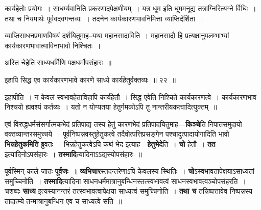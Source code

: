 \documentclass[article,12pt,a4paper]{memoir}
\begin{document}
	  \endgroup
	 

	  \pstart कार्यहेतोः प्रयोगः । साधर्म्यवानिति प्रकरणादपेक्षणीयम् । यत्र धूम इति धूममनूद्य तत्राग्निरित्यग्ने र्विधिः । तथा च नियमार्थः पूर्ववदवगन्तव्यः । तदनेन कार्यकारणभावनिमित्ता व्याप्तिर्दर्शिता ।
	\pend
        

	  \pstart व्याप्तिसाधनप्रमाणविषयं दर्शयितुमाह--यथा महानसादाविति । महानसादौ हि प्रत्यक्षानुपलम्भाभ्यां कार्यकारणभावात्माविनाभावो निश्चितः ।
	\pend
        

	  \pstart अस्ति चेहेति साध्यधर्मिणि पक्षधर्मोपसंहारः ॥
	\pend
        
	  \bigskip
	  \begingroup
	

	  \pstart इहापि सिद्ध एव कार्यकारणभावे कारणे साध्ये कार्यहेतुर्वक्तव्यः ॥ २२ ॥
	\pend
      
	  \endgroup
	 

	  \pstart इहापीति । न केवलं स्वभावहेताविहापि कार्यहेतौ । सिद्ध एवेति निश्चिते कार्यकारणत्वे । कार्यकारणभाव निश्चयो ह्यवश्यं कर्तव्यः । यतो न योग्यतया हेतुर्गमकोऽपि तु नान्तरीयकत्वादित्युक्तम् ॥
	\pend
      
	  \endgroup
	

	  \pstart एवं विरुद्धधर्मसंसर्गात्मकभेदं प्रतिपाद्य तस्य हेतुं कारणभेदं प्रतिपादयितुमाह—\textbf{किञ्चे}ति निपातसमुदायो वक्तव्यान्तरसमुच्चये । पूर्वनिष्पन्नवस्तुहेतुकत्वे तदैवोत्पत्तिप्रसङ्गेन पश्चादुत्पादायोगादिति भावो \textbf{भिन्नहेतुकमिति} ब्रुवतः । भिन्नहेतुकत्वेऽपि कथं भेद इत्याह—\textbf{हेतुभेदे}ति । \textbf{चो} हेतौ । \textbf{तत} इत्यादिनोऽपसंहारः । \textbf{तस्मादि}त्यादिनाऽऽद्यस्योपसंहारः ॥
	\pend
      

	  \pstart पूर्वस्मिन् काले जातः \textbf{पूर्वजः । व्यभिचार}स्तदन्तरेणाऽपि केवलस्य स्थितिः । \textbf{चो}ऽस्वभावतापेक्षयाऽसाध्यतां समुच्चिनोति । \textbf{तस्मादि}त्यादिना साधनधर्ममात्रानुबन्धिनस्तत्स्वभावत्वं साधनस्वभावत्वञ्चोपसंहरति । चशब्दः \textbf{साध्य} इत्यस्यानन्तरं तत्स्वभावत्वापेक्षया साध्यत्वं समुच्चिनोति । \textbf{तथा च} तन्निष्पत्तावेव निष्पन्नस्य तादात्म्ये तन्मात्रानुबन्धिन एव च साध्यत्वे सति ॥
	\pend
	  \bigskip
	  \begingroup
	
\end{document}
